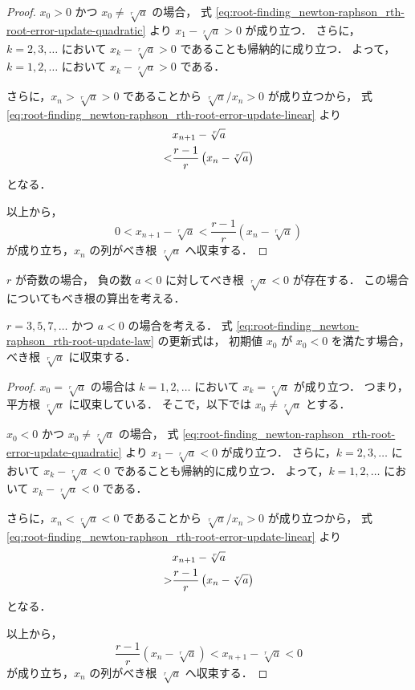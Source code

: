 \begin{proof}
    $x_0 > 0$ かつ $x_0 \neq \sqrt[r]{a}$ の場合，
    式 \eqref{eq:root-finding_newton-raphson_rth-root-error-update-quadratic} より
    $x_1 - \sqrt[r]{a} > 0$ が成り立つ．
    さらに，$k = 2, 3, \ldots$ において $x_k - \sqrt[r]{a} > 0$ であることも帰納的に成り立つ．
    よって，$k = 1, 2, \ldots$ において $x_k - \sqrt[r]{a} > 0$ である．

    さらに，$x_n > \sqrt[r]{a} > 0$ であることから
    $\sqrt[r]{a} / x_n > 0$ が成り立つから，
    式 \eqref{eq:root-finding_newton-raphson_rth-root-error-update-linear} より
    \begin{align}
          & x_{n+1} - \sqrt[r]{a}                          \notag \\
        < & \frac{r - 1}{r} \left(x_n - \sqrt[r]{a}\right)
    \end{align}
    となる．

    以上から，
    \begin{equation}
        0 < x_{n+1} - \sqrt[r]{a} < \frac{r - 1}{r} \left(x_n - \sqrt[r]{a}\right)
        \label{eq:root-finding_newton-raphson_rth-root-error-convergence}
    \end{equation}
    が成り立ち，$x_n$ の列がべき根 $\sqrt[r]{a}$ へ収束する．
\end{proof}

$r$ が奇数の場合，
負の数 $a < 0$ に対してべき根 $\sqrt[r]{a} < 0$ が存在する．
この場合についてもべき根の算出を考える．

\begin{theorem}
    $r = 3, 5, 7, \ldots$ かつ $a < 0$ の場合を考える．
    式 \eqref{eq:root-finding_newton-raphson_rth-root-update-law} の更新式は，
    初期値 $x_0$ が $x_0 < 0$ を満たす場合，
    べき根 $\sqrt[r]{a}$ に収束する．
\end{theorem}
\begin{proof}
    $x_0 = \sqrt[r]{a}$ の場合は
    $k = 1, 2, \ldots$ において $x_k = \sqrt[r]{a}$ が成り立つ．
    つまり，平方根 $\sqrt[r]{a}$ に収束している．
    そこで，以下では $x_0 \neq \sqrt[r]{a}$ とする．

    $x_0 < 0$ かつ $x_0 \neq \sqrt[r]{a}$ の場合，
    式 \eqref{eq:root-finding_newton-raphson_rth-root-error-update-quadratic} より
    $x_1 - \sqrt[r]{a} < 0$ が成り立つ．
    さらに，$k = 2, 3, \ldots$ において $x_k - \sqrt[r]{a} < 0$ であることも帰納的に成り立つ．
    よって，$k = 1, 2, \ldots$ において $x_k - \sqrt[r]{a} < 0$ である．

    さらに，$x_n < \sqrt[r]{a} < 0$ であることから
    $\sqrt[r]{a} / x_n > 0$ が成り立つから，
    式 \eqref{eq:root-finding_newton-raphson_rth-root-error-update-linear} より
    \begin{align}
          & x_{n+1} - \sqrt[r]{a}                          \notag \\
        > & \frac{r - 1}{r} \left(x_n - \sqrt[r]{a}\right)
    \end{align}
    となる．

    以上から，
    \begin{equation}
        \frac{r - 1}{r} \left(x_n - \sqrt[r]{a}\right) < x_{n+1} - \sqrt[r]{a} < 0
    \end{equation}
    が成り立ち，$x_n$ の列がべき根 $\sqrt[r]{a}$ へ収束する．
\end{proof}
